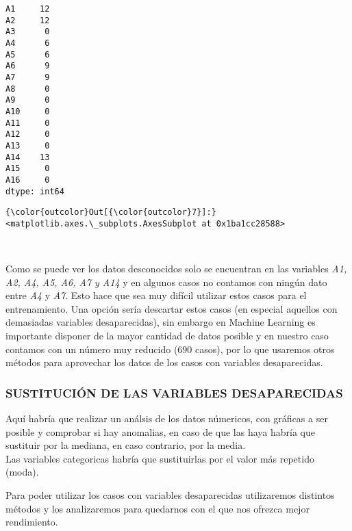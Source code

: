 \documentclass[11pt]{article}
\begin{document}
    \begin{Verbatim}[commandchars=\\\{\}]
A1     12
A2     12
A3      0
A4      6
A5      6
A6      9
A7      9
A8      0
A9      0
A10     0
A11     0
A12     0
A13     0
A14    13
A15     0
A16     0
dtype: int64

    \end{Verbatim}

\begin{Verbatim}[commandchars=\\\{\}]
{\color{outcolor}Out[{\color{outcolor}7}]:} <matplotlib.axes.\_subplots.AxesSubplot at 0x1ba1cc28588>
\end{Verbatim}
            
    \begin{center}
    \end{center}
    { \hspace*{\fill} \\}
    
    Como se puede ver los datos desconocidos solo se encuentran en las
variables \emph{A1, A2, A4, A5, A6, A7 y A14} y en algunos casos no
contamos con ningún dato entre \emph{A4} y \emph{A7}. Esto hace que sea
muy difícil utilizar estos casos para el entrenamiento. Una opción sería
descartar estos casos (en especial aquellos con demasiadas variables
desaparecidas), sin embargo en Machine Learning es importante disponer
de la mayor cantidad de datos posible y en nuestro caso contamos con un
número muy reducido (690 casos), por lo que usaremos otros métodos para
aprovechar los datos de los casos con variables desaparecidas.

    \subsubsection{SUSTITUCIÓN DE LAS VARIABLES
DESAPARECIDAS}\label{sustituciuxf3n-de-las-variables-desaparecidas}

    Aquí habría que realizar un análsis de los datos númericos, con gráficas
a ser posible y comprobar si hay anomalias, en caso de que las haya
habría que sustituir por la mediana, en caso contrario, por la media.\\
Las variables categoricas habría que sustituirlas por el valor más
repetido (moda).

    Para poder utilizar los casos con variables desaparecidas utilizaremos
distintos métodos y los analizaremos para quedarnos con el que nos
ofrezca mejor rendimiento.
\end{document}
